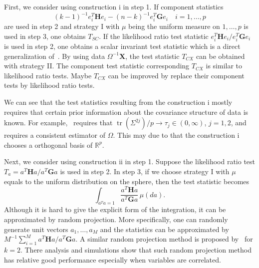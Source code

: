 \documentclass[12pt]{article} %
\DeclareMathOperator{\mytr}{tr}
\newcommand{\bX}{\mathbf{X}}
\newcommand{\bH}{\mathbf{H}}
\newcommand{\bG}{\mathbf{G}}
\theoremstyle{definition}
\begin{document}
First, we consider using construction i in step 1.
If component statistics 
$${(k-1)^{-1}} e_i^T \bH e_i-(n-k)^{-1}e_i^T \bG e_i\quad i=1,\ldots, p$$
are used in step 2 and strategy I with $\mu$ being the uniform measure on $1,\ldots,p$ is used in step 3, one obtains $T_{SC}$.
If the likelihood ratio test statistic $e_i^T \bH e_i/e_i^T \bG e_i$ is used in step 2, one obtains a scalar invariant test statistic which is a direct generalization of~\citet{Srivastava2009A}.
By using data $\Omega^{-1}\bX$, the test statistic $T_{CX}$ can be obtained with strategy II.
The component test statistic corresponding $T_{CX}$ is similar to likelihood ratio tests.
Maybe $T_{CX}$ can be improved by replace their component tests by likelihood ratio tests.

We can see that the test statistics resulting from the construction i mostly requires that certain prior information about the covariance structure of data is known.
For example,~\citet{Schott2007Some} requires that $\mytr(\Sigma^{2j})/p\to \tau_j\in(0,\infty)$, $j=1,2$, and~\citet{Cai2014High} requires a consistent estimator of $\Omega$.
This may due to that the construction i chooses a orthogonal basis of $\mathbb{R}^p$.




Next, we consider using  construction ii in step 1.
Suppose the likelihood ratio test $T_a=a^T \bH a/a^T \bG a$ is used in step 2.
In step 3, if we choose strategy I with $\mu$ equals to the uniform distribution on the sphere, then the test statistic becomes
$$
\int_{a^T a=1} \frac{a^T \bH a}{a^T \bG a}\, \mu(da).
$$
Although it is hard to give the explicit form of the integration, it can be approximated by random projection. More specifically, one can randomly generate unit vectors $a_1,\ldots,a_M$ and the statistics can be approximated by $M^{-1}\sum_{i=1}^M a^T \bH a/a^T \bG a$.
A similar random projection method is proposed by~\cite{Lopes2015A} for $k=2$.
There analysis and simulations show that such random projection method has relative good performance especially when variables are correlated.
\end{document}
